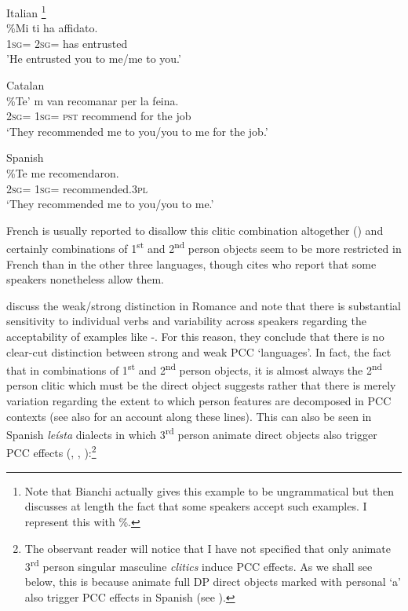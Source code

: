 \documentclass[output=paper,colorlinks,citecolor=brown,nonflat]{./langscibook}
\begin{document}
\ea%
    \label{ex:sheehan:5}
    Italian \citep[2027]{Bianchi2006}\footnote{Note that Bianchi actually gives this example to be ungrammatical but then discusses at length the fact that some speakers accept such examples. I represent this with \%.}\\
    \gll    \%Mi   ti     ha   affidato.\\
            \textsc{1sg}=  \textsc{2sg=}   has   entrusted\\
    \glt    'He entrusted you to me/me to you.’
\z

\ea%
    \label{ex:sheehan:6}
    Catalan \citep[179]{Bonet1991}\\
    \gll    \%Te’  m   van   recomanar   per   la   feina.\\
            \textsc{2sg=}  \textsc{1sg}=   \textsc{pst}   recommend  for   the   job\\
    \glt    ‘They recommended me to you/you to me for the job.’
\z

\ea%
    \label{ex:sheehan:7}
    Spanish \citep[61]{Perlmutter1971}\\
    \gll    \%Te   me   recomendaron.\\
            \textsc{2sg}=  \textsc{1sg}=   recommended.\textsc{3pl}\\
    \glt    ‘They recommended me to you/you to me.’
\z

French is usually reported to disallow this clitic combination altogether (\citealt{Kayne1975, Quicoli1984}) and certainly combinations of 1\textsuperscript{st} and 2\textsuperscript{nd} person objects seem to be more restricted in French than in the other three languages, though \citet[180]{Bonet1991} cites \citet{SimpsonWithgott1986} who report that some speakers nonetheless allow them. 

\citet{OrmazabalRomero2007} discuss the weak/strong distinction in Romance and note that there is substantial sensitivity to individual verbs and variability across speakers regarding the acceptability of examples like -. For this reason, they conclude that there is no clear-cut distinction between strong and weak PCC ‘languages’. In fact, the fact that in combinations of 1\textsuperscript{st} and 2\textsuperscript{nd} person objects, it is almost always the 2\textsuperscript{nd} person clitic which must be the direct object suggests rather that there is merely variation regarding the extent to which person features are decomposed in PCC contexts (see also \citealt{Anagnostopoulou2005} for an account along these lines). This can also be seen in Spanish \textit{leísta} dialects in which 3\textsuperscript{rd} person animate direct objects also trigger PCC effects (\citealt{OrmazabalRomero2007}, \citeyear{OrmazabalRomero2010}, \citeyear{OrmazabalRomero2013Borealis}):\footnote{The observant reader will notice that I have not specified that only animate 3\textsuperscript{rd} person singular masculine \textit{clitics} induce PCC effects. As we shall see below, this is because animate full DP direct objects marked with personal ‘a’ also trigger PCC effects in Spanish (see \citealt{OrmazabalRomero2013Borealis}).} 
\end{document}
